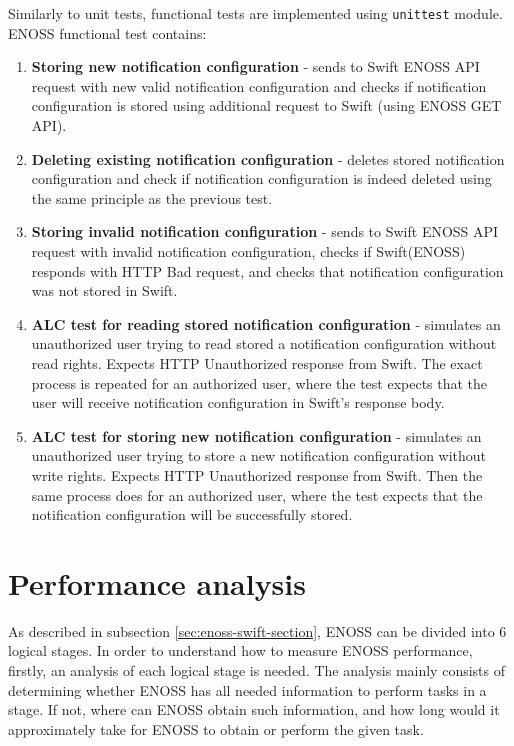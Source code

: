     Similarly to unit tests, functional tests are implemented using \texttt{unittest} module. ENOSS functional test contains:
    \begin{enumerate}
        \item \textbf{Storing new notification configuration} - sends to Swift ENOSS API request with new valid notification configuration and checks if notification configuration is stored using additional request to Swift (using ENOSS GET API).
        \item \textbf{Deleting existing notification configuration} - deletes stored notification configuration and check if notification configuration is indeed deleted using the same principle as the previous test.
        \item \textbf{Storing invalid notification configuration} - sends to Swift ENOSS API request with invalid notification configuration, checks if Swift(ENOSS) responds with HTTP Bad request, and checks that notification configuration was not stored in Swift.
        \item \textbf{ALC test for reading stored notification configuration} - simulates an unauthorized user trying to read stored a notification configuration without read rights. Expects HTTP Unauthorized response from Swift. The exact process is repeated for an authorized user, where the test expects that the user will receive notification configuration in Swift's response body.
        \item \textbf{ALC test for storing new notification configuration} - simulates an unauthorized user trying to store a new notification configuration without write rights. Expects HTTP Unauthorized response from Swift. Then the same process does for an authorized user, where the test expects that the notification configuration will be successfully stored.
    \end{enumerate}
\section{Performance analysis}
    As described in subsection \ref{sec:enoss-swift-section}, ENOSS can be divided into 6 logical stages. In order to understand how to measure ENOSS performance, firstly, an analysis of each logical stage is needed. The analysis mainly consists of determining whether ENOSS has all needed information to perform tasks in a stage. If not, where can ENOSS obtain such information, and how long would it approximately take for ENOSS to obtain or perform the given task.

